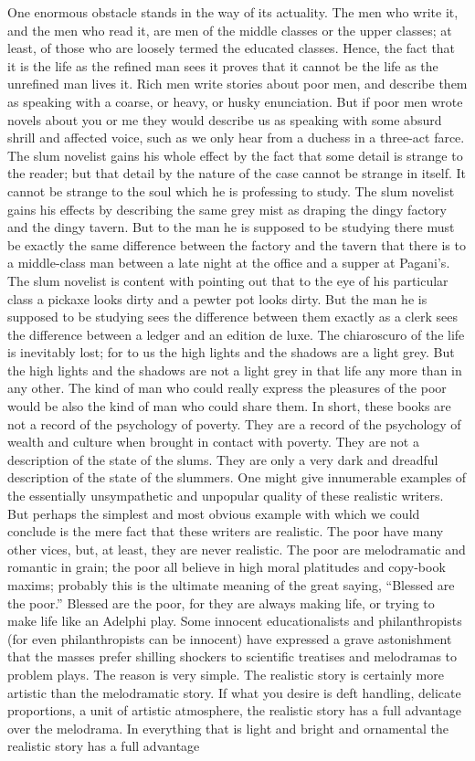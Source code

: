 One enormous obstacle stands in the way of its actuality. The men who write it, and the men who read it, are men of the middle classes or the upper classes; at least, of those who are loosely termed the educated classes. Hence, the fact that it is the life as the refined man sees it proves that it cannot be the life as the unrefined man lives it. Rich men write stories about poor men, and describe them as speaking with a coarse, or heavy, or husky enunciation. But if poor men wrote novels about you or me they would describe us as speaking with some absurd shrill and affected voice, such as we only hear from a duchess in a three-act farce. The slum novelist gains his whole effect by the fact that some detail is strange to the reader; but that detail by the nature of the case cannot be strange in itself. It cannot be strange to the soul which he is professing to study. The slum novelist gains his effects by describing the same grey mist as draping the dingy factory and the dingy tavern. But to the man he is supposed to be studying there must be exactly the same difference between the factory and the tavern that there is to a middle-class man between a late night at the office and a supper at Pagani’s. The slum novelist is content with pointing out that to the eye of his particular class a pickaxe looks dirty and a pewter pot looks dirty. But the man he is supposed to be studying sees the difference between them exactly as a clerk sees the difference between a ledger and an edition de luxe. The chiaroscuro of the life is inevitably lost; for to us the high lights and the shadows are a light grey. But the high lights and the shadows are not a light grey in that life any more than in any other. The kind of man who could really express the pleasures of the poor would be also the kind of man who could share them. In short, these books are not a record of the psychology of poverty. They are a record of the psychology of wealth and culture when brought in contact with poverty. They are not a description of the state of the slums. They are only a very dark and dreadful description of the state of the slummers. One might give innumerable examples of the essentially unsympathetic and unpopular quality of these realistic writers. But perhaps the simplest and most obvious example with which we could conclude is the mere fact that these writers are realistic. The poor have many other vices, but, at least, they are never realistic. The poor are melodramatic and romantic in grain; the poor all believe in high moral platitudes and copy-book maxims; probably this is the ultimate meaning of the great saying, “Blessed are the poor.” Blessed are the poor, for they are always making life, or trying to make life like an Adelphi play. Some innocent educationalists and philanthropists (for even philanthropists can be innocent) have expressed a grave astonishment that the masses prefer shilling shockers to scientific treatises and melodramas to problem plays. The reason is very simple. The realistic story is certainly more artistic than the melodramatic story. If what you desire is deft handling, delicate proportions, a unit of artistic atmosphere, the realistic story has a full advantage over the melodrama. In everything that is light and bright and ornamental the realistic story has a full advantage 